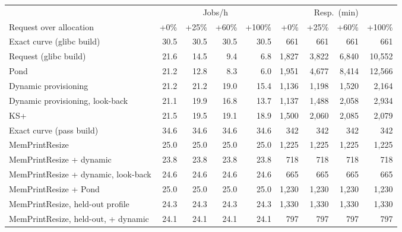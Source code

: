 \begin{tabular}{lrrrrrrrr}
\toprule
 & \multicolumn{4}{c}{Jobs/h} & \multicolumn{4}{c}{Resp.\ (min)} \\
\cmidrule(lr){2-5} \cmidrule(lr){6-9}
Request over allocation & +0\% & +25\% & +60\% & +100\% & +0\% & +25\% & +60\% & +100\% \\
\midrule
Exact curve (glibc build) & 30.5 & 30.5 & 30.5 & 30.5 & 661 & 661 & 661 & 661 \\
Request (glibc build) & 21.6 & 14.5 & 9.4 & 6.8 & 1{,}827 & 3{,}822 & 6{,}840 & 10{,}552 \\
Pond & 21.2 & 12.8 & 8.3 & 6.0 & 1{,}951 & 4{,}677 & 8{,}414 & 12{,}566 \\
Dynamic provisioning & 21.2 & 21.2 & 19.0 & 15.4 & 1{,}136 & 1{,}198 & 1{,}520 & 2{,}164 \\
Dynamic provisioning, look-back & 21.1 & 19.9 & 16.8 & 13.7 & 1{,}137 & 1{,}488 & 2{,}058 & 2{,}934 \\
KS+ & 21.5 & 19.5 & 19.1 & 18.9 & 1{,}500 & 2{,}060 & 2{,}085 & 2{,}079 \\
Exact curve (pass build) & 34.6 & 34.6 & 34.6 & 34.6 & 342 & 342 & 342 & 342 \\
MemPrintResize & 25.0 & 25.0 & 25.0 & 25.0 & 1{,}225 & 1{,}225 & 1{,}225 & 1{,}225 \\
MemPrintResize + dynamic & 23.8 & 23.8 & 23.8 & 23.8 & 718 & 718 & 718 & 718 \\
MemPrintResize + dynamic, look-back & 24.6 & 24.6 & 24.6 & 24.6 & 665 & 665 & 665 & 665 \\
MemPrintResize + Pond & 25.0 & 25.0 & 25.0 & 25.0 & 1{,}230 & 1{,}230 & 1{,}230 & 1{,}230 \\
MemPrintResize, held-out profile & 24.3 & 24.3 & 24.3 & 24.3 & 1{,}330 & 1{,}330 & 1{,}330 & 1{,}330 \\
MemPrintResize, held-out, + dynamic & 24.1 & 24.1 & 24.1 & 24.1 & 797 & 797 & 797 & 797 \\
\bottomrule
\end{tabular}
